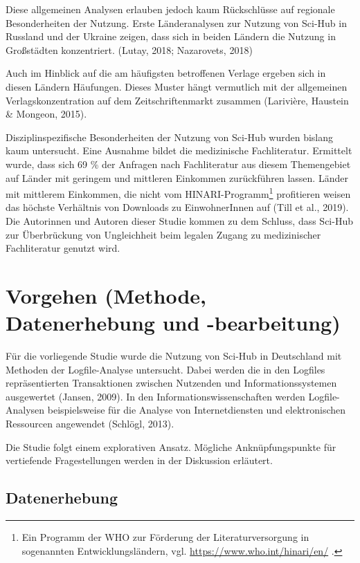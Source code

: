 \documentclass[a4paper,
fontsize=11pt,
oneside,
numbers=noperiodatend,
parskip=half-,
bibliography=totoc,
final
]{scrartcl}
\begin{document}
Diese allgemeinen Analysen erlauben jedoch kaum Rückschlüsse auf
regionale Besonderheiten der Nutzung. Erste Länderanalysen zur Nutzung
von Sci-Hub in Russland und der Ukraine zeigen, dass sich in beiden
Ländern die Nutzung in Großstädten konzentriert. (Lutay, 2018;
Nazarovets, 2018)

Auch im Hinblick auf die am häufigsten betroffenen Verlage ergeben sich
in diesen Ländern Häufungen. Dieses Muster hängt vermutlich mit der
allgemeinen Verlagskonzentration auf dem Zeitschriftenmarkt zusammen
(Larivière, Haustein \& Mongeon, 2015).

Disziplinspezifische Besonderheiten der Nutzung von Sci-Hub wurden
bislang kaum untersucht. Eine Ausnahme bildet die medizinische
Fachliteratur. Ermittelt wurde, dass sich 69 \% der Anfragen nach
Fachliteratur aus diesem Themengebiet auf Länder mit geringem und
mittleren Einkommen zurückführen lassen. Länder mit mittlerem Einkommen,
die nicht vom HINARI-Programm\footnote{Ein Programm der WHO zur
  Förderung der Literaturversorgung in sogenannten Entwicklungsländern,
  vgl. \url{https://www.who.int/hinari/en/} .} profitieren weisen das
höchste Verhältnis von Downloads zu EinwohnerInnen auf (Till et al.,
2019). Die Autorinnen und Autoren dieser Studie kommen zu dem Schluss,
dass Sci-Hub zur Überbrückung von Ungleichheit beim legalen Zugang zu
medizinischer Fachliteratur genutzt wird.

\hypertarget{vorgehen-methode-datenerhebung-und--bearbeitung}{%
\section{Vorgehen (Methode, Datenerhebung und
-bearbeitung)}\label{vorgehen-methode-datenerhebung-und--bearbeitung}}

Für die vorliegende Studie wurde die Nutzung von Sci-Hub in Deutschland
mit Methoden der Logfile-Analyse untersucht. Dabei werden die in den
Logfiles repräsentierten Transaktionen zwischen Nutzenden und
Informationssystemen ausgewertet (Jansen, 2009). In den
Informationswissenschaften werden Logfile-Analysen beispielsweise für
die Analyse von Internetdiensten und elektronischen Ressourcen
angewendet (Schlögl, 2013).

Die Studie folgt einem explorativen Ansatz. Mögliche Anknüpfungspunkte
für vertiefende Fragestellungen werden in der Diskussion erläutert.

\hypertarget{datenerhebung}{%
\subsection{Datenerhebung}\label{datenerhebung}}
\end{document}
